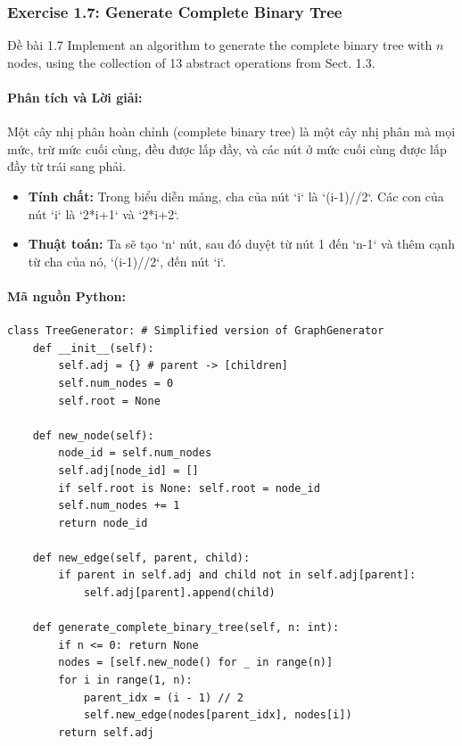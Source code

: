 \documentclass[a4paper,12pt]{article}
\begin{document}
\subsubsection{Exercise 1.7: Generate Complete Binary Tree}
\begin{problembox}{Đề bài 1.7}
    Implement an algorithm to generate the complete binary tree with $n$ nodes, using the collection of 13 abstract operations from Sect. 1.3.
\end{problembox}
\paragraph{Phân tích và Lời giải:}
Một cây nhị phân hoàn chỉnh (complete binary tree) là một cây nhị phân mà mọi mức, trừ mức cuối cùng, đều được lấp đầy, và các nút ở mức cuối cùng được lấp đầy từ trái sang phải.
\begin{itemize}
    \item \textbf{Tính chất:} Trong biểu diễn mảng, cha của nút `i` là `(i-1)//2`. Các con của nút `i` là `2*i+1` và `2*i+2`.
    \item \textbf{Thuật toán:} Ta sẽ tạo `n` nút, sau đó duyệt từ nút 1 đến `n-1` và thêm cạnh từ cha của nó, `(i-1)//2`, đến nút `i`.
\end{itemize}
\paragraph{Mã nguồn Python:}
\begin{lstlisting}[style=pythonstyle, caption={Sinh cây nhị phân hoàn chỉnh.}]
class TreeGenerator: # Simplified version of GraphGenerator
    def __init__(self):
        self.adj = {} # parent -> [children]
        self.num_nodes = 0
        self.root = None
        
    def new_node(self):
        node_id = self.num_nodes
        self.adj[node_id] = []
        if self.root is None: self.root = node_id
        self.num_nodes += 1
        return node_id
        
    def new_edge(self, parent, child):
        if parent in self.adj and child not in self.adj[parent]:
            self.adj[parent].append(child)

    def generate_complete_binary_tree(self, n: int):
        if n <= 0: return None
        nodes = [self.new_node() for _ in range(n)]
        for i in range(1, n):
            parent_idx = (i - 1) // 2
            self.new_edge(nodes[parent_idx], nodes[i])
        return self.adj
\end{lstlisting}
\end{document}
